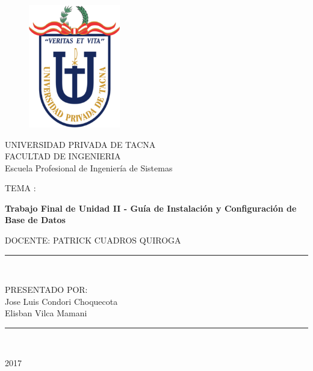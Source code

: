 \documentclass[a4paper,openright,12pt]{book}
\begin{document}
\begin{titlepage}
\begin{center}
\begin{figure}[htb]
\begin{center}
\includegraphics[width=4cm]{./images/upt}
\end{center}
\end{figure}

UNIVERSIDAD PRIVADA DE TACNA\\
\vspace*{0.10in}
FACULTAD DE INGENIERIA\\
Escuela Profesional de Ingeniería de Sistemas\\
\vspace*{0.2in}
\begin{large}
TEMA : \\
\end{large}
\vspace*{0.2in}
\begin{Large}
\textbf{Trabajo Final de Unidad II - Guía de Instalación y Configuración de Base de Datos} \\
\end{Large}
\vspace*{0.3in}
\begin{large}
DOCENTE: PATRICK CUADROS QUIROGA\\
\end{large}
\vspace*{0.3in}
\rule{80mm}{0.1mm}\\
\vspace*{0.1in}
\begin{large}
PRESENTADO POR: \\
Jose Luis Condori Choquecota \\
Elisban Vilca Mamani\\

\end{large}
\rule{80mm}{0.1mm}\\
\begin{large}
2017\\
\end{large}
\end{center}
\end{titlepage}
\end{document}
